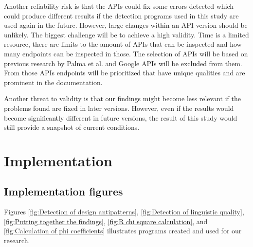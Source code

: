 \documentclass[a4paper,12pt]{article}
\begin{document}
Another reliability risk is that the APIs could fix some errors detected which could produce different results if the detection programs used in this study are used again in the future. However, large changes within an API version should be unlikely. 
The biggest challenge will be to achieve a high validity. Time is a limited resource, there are limits to the amount of APIs that can be inspected and how many endpoints can be inspected in those. The  selection of APIs will be based on previous research by Palma et al. \cite{linguistic} and Google APIs will be excluded from them. From those APIs endpoints will be prioritized that have unique qualities and are prominent in the documentation. 

Another threat to validity is that our findings might become less relevant if the problems found are fixed in later versions. However, even if the results would become significantly different in future versions, the result of this study would still provide a snapshot of current conditions. 

\newpage

\section{Implementation}

\subsection{Implementation figures}

Figures \ref{fig:Detection of design antipatterns}, \ref{fig:Detection of linguistic quality}, \ref{fig:Putting together the findings}, \ref{fig:R chi square calculation}, and \ref{fig:Calculation of phi coefficients} illustrates programs created and used for our research.
\end{document}
